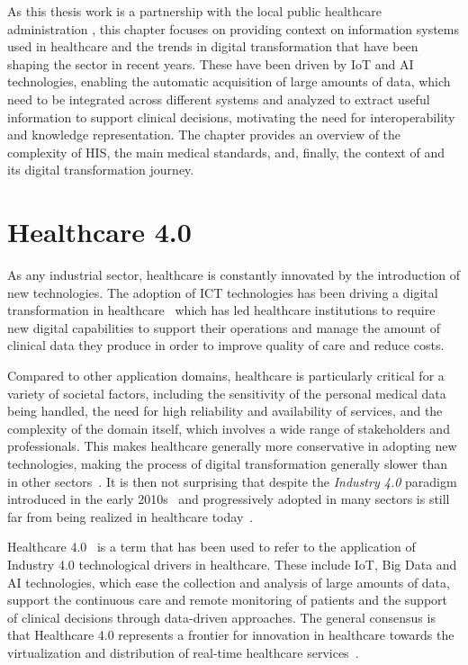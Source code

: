 As this thesis work is a partnership with the local public healthcare administration \ausl{},
this chapter focuses on providing context on information systems used in healthcare and the trends in digital transformation that have been shaping the sector in recent years.
These have been driven by \ac{IoT} and \ac{AI} technologies,
enabling the automatic acquisition of large amounts of data, which need to be integrated across different systems and analyzed to extract useful information to support clinical decisions, motivating the need for interoperability and knowledge representation.
%
The chapter provides an overview of the complexity of \ac{HIS},
the main medical standards, and, finally, the context of \ausl{} and its digital transformation journey.

\section{Healthcare 4.0}

As any industrial sector, healthcare is constantly innovated by the introduction of new technologies.
%
The adoption of \ac{ICT} technologies has been driving a digital transformation in healthcare~\cite{Kraus_Schiavone_Pluzhnikova_Invernizzi_2021} which has led healthcare institutions to require new digital capabilities to support their operations and manage the amount of clinical data they produce in order to improve quality of care and reduce costs. 

Compared to other application domains, healthcare is particularly critical for a variety of societal factors, 
including the sensitivity of the personal medical data being handled, the need for high reliability and availability of services, and the complexity of the domain itself, which involves a wide range of stakeholders and professionals. 
%
This makes healthcare generally more conservative in adopting new technologies, making the process of digital transformation generally slower than in other sectors~\cite{Hermes_Riasanow_Clemons_Böhm_Krcmar_2020}.
%
It is then not surprising that despite the \emph{Industry 4.0} paradigm introduced in the early 2010s~\cite{Lasi_Fettke_Kemper_Feld_Hoffmann_2014} and progressively adopted in many sectors is still far from being realized in healthcare today~\cite{Kotzias_Bukhsh_Arachchige_Daneva_Abhishta_2022}.

Healthcare 4.0~\cite{Tortorella_Fogliatto_Mac_Cawley_Vergara_Vassolo_Sawhney_2020} is a term that has been used to refer to the application of Industry 4.0 technological drivers in healthcare.
%
These include \ac{IoT}, Big Data and \ac{AI} technologies, which ease the collection and analysis of large amounts of data, support the continuous care and remote monitoring of patients and the support of clinical decisions through data-driven approaches.
%
The general consensus is that Healthcare 4.0 represents a frontier for innovation in healthcare towards the virtualization and distribution of real-time healthcare services~\cite{Kotzias_Bukhsh_Arachchige_Daneva_Abhishta_2022}.


